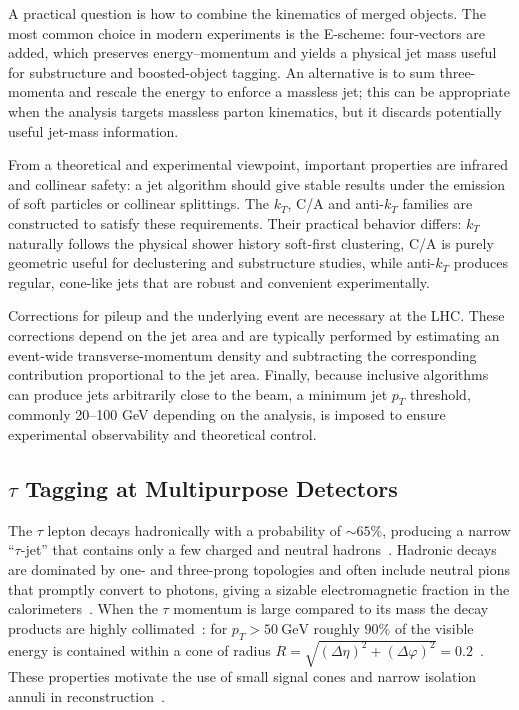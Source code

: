 A practical question is how to combine the kinematics of merged objects. The most common choice in modern experiments is the E-scheme: four-vectors are added, which preserves energy–momentum and yields a physical jet mass useful for substructure and boosted-object tagging. An alternative is to sum three-momenta and rescale the energy to enforce a massless jet; this can be appropriate when the analysis targets massless parton kinematics, but it discards potentially useful jet-mass information.

From a theoretical and experimental viewpoint, important properties are infrared and collinear safety: a jet algorithm should give stable results under the emission of soft particles or collinear splittings. The $k_T$, C/A and anti-$k_T$ families are constructed to satisfy these requirements. Their practical behavior differs: $k_T$ naturally follows the physical shower history soft-first clustering, C/A is purely geometric useful for declustering and substructure studies, while anti-$k_T$ produces regular, cone-like jets that are robust and convenient experimentally.

Corrections for pileup and the underlying event are necessary at the LHC. These corrections depend on the jet area and are typically performed by estimating an event-wide transverse-momentum density and subtracting the corresponding contribution proportional to the jet area. Finally, because inclusive algorithms can produce jets arbitrarily close to the beam, a minimum jet $p_T$ threshold, commonly 20–100 GeV depending on the analysis, is imposed to ensure experimental observability and theoretical control.

\subsection{$\tau$ Tagging at Multipurpose Detectors}

The $\tau$ lepton decays hadronically with a probability of $\sim65\%$, producing a narrow ``$\tau$-jet'' that contains only a few charged and neutral hadrons~\cite{1674-1137-40-10-100001,CMS:2018jrd}. Hadronic decays are dominated by one- and three-prong topologies and often include neutral pions that promptly convert to photons, giving a sizable electromagnetic fraction in the calorimeters~\cite{1674-1137-40-10-100001,ATLAS:2014rzk}. When the $\tau$ momentum is large compared to its mass the decay products are highly collimated~\cite{CMS:2018jrd,CMS_DeepTau}: for $p_T>50\ \mathrm{GeV}$ roughly $90\%$ of the visible energy is contained within a cone of radius $R=\sqrt{(\Delta\eta)^2+(\Delta\varphi)^2}=0.2$~\cite{CMS:2018jrd}. These properties motivate the use of small signal cones and narrow isolation annuli in reconstruction~\cite{CMS:2018jrd,CMS_DeepTau}.

